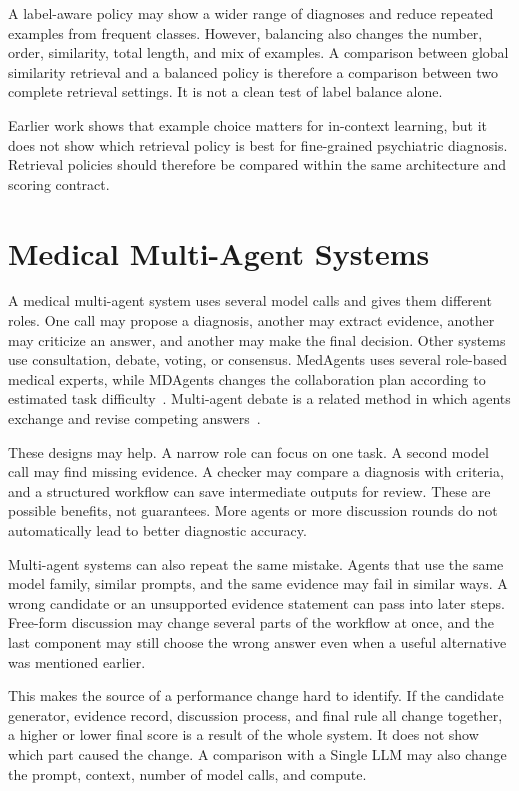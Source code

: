 \documentclass[12pt,a4paper,oneside]{report}
\begin{document}
A label-aware policy may show a wider range of diagnoses and reduce repeated examples from frequent classes. However, balancing also changes the number, order, similarity, total length, and mix of examples. A comparison between global similarity retrieval and a balanced policy is therefore a comparison between two complete retrieval settings. It is not a clean test of label balance alone.

Earlier work shows that example choice matters for in-context learning, but it does not show which retrieval policy is best for fine-grained psychiatric diagnosis. Retrieval policies should therefore be compared within the same architecture and scoring contract.

\section{Medical Multi-Agent Systems}

A medical multi-agent system uses several model calls and gives them different roles. One call may propose a diagnosis, another may extract evidence, another may criticize an answer, and another may make the final decision. Other systems use consultation, debate, voting, or consensus. MedAgents uses several role-based medical experts, while MDAgents changes the collaboration plan according to estimated task difficulty~\citep{tang2024medagents,kim2024mdagents}. Multi-agent debate is a related method in which agents exchange and revise competing answers~\citep{du2024debate}.

These designs may help. A narrow role can focus on one task. A second model call may find missing evidence. A checker may compare a diagnosis with criteria, and a structured workflow can save intermediate outputs for review. These are possible benefits, not guarantees. More agents or more discussion rounds do not automatically lead to better diagnostic accuracy.

Multi-agent systems can also repeat the same mistake. Agents that use the same model family, similar prompts, and the same evidence may fail in similar ways. A wrong candidate or an unsupported evidence statement can pass into later steps. Free-form discussion may change several parts of the workflow at once, and the last component may still choose the wrong answer even when a useful alternative was mentioned earlier.

This makes the source of a performance change hard to identify. If the candidate generator, evidence record, discussion process, and final rule all change together, a higher or lower final score is a result of the whole system. It does not show which part caused the change. A comparison with a Single LLM may also change the prompt, context, number of model calls, and compute.
\end{document}
